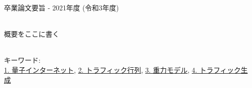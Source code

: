 卒業論文要旨 - 2021年度 (令和3年度)
\begin{center}
\begin{large}
\end{large}
\end{center}

~ \\

概要をここに書く

~ \\
キーワード:\\
\underline{1. 量子インターネット},
\underline{2. トラフィック行列},
\underline{3. 重力モデル},
\underline{4. トラフィック生成}
\begin{flushright}
\dept \\
\author
\end{flushright}
